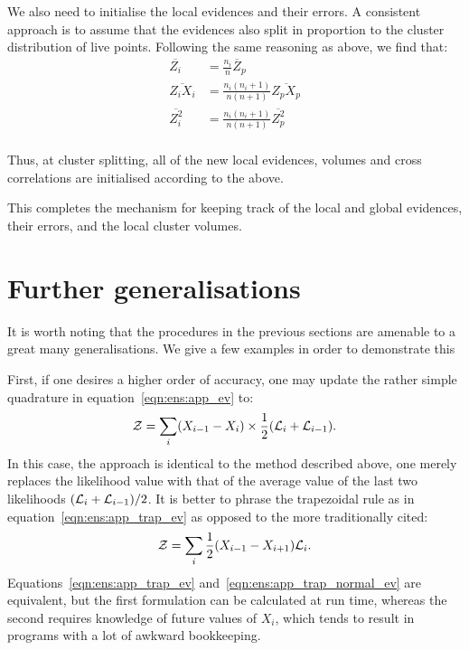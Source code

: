 We also need to initialise the local evidences and their errors. A consistent approach is to assume that the evidences also split in proportion to the cluster distribution of live points. Following the same reasoning as above, we find that:
\begin{align}
  \overline{Z_i}&=  \frac{n_i}{n} \overline Z_p \\
  \overline{Z_i X_i}&= \frac{n_i(n_i+1)}{n(n+1)} \overline{Z_p X_p} \\
  \overline{Z_i^2}  &= \frac{n_i(n_i+1)}{n(n+1)} \overline{Z_p^2} \\
\end{align}

Thus, at cluster splitting, all of the new local evidences, volumes and cross correlations are initialised according to the above.

This completes the mechanism for keeping track of the local and global evidences, their errors, and the local cluster volumes.


\section{Further generalisations}

It is worth noting that the procedures in the previous sections are amenable to a great many generalisations. We give a few examples in order to demonstrate this

First, if one desires a higher order of accuracy, one may update the rather simple quadrature in equation~\eqref{eqn:ens:app_ev} to:
\begin{equation}
  \mathcal{Z} = \sum\limits_{i} (X_{i-1}-X_{i}) \times \frac{1}{2}(\mathcal{L}_i+\mathcal{L}_{i-1}).
  \label{eqn:ens:app_trap_ev}
\end{equation}
In this case, the approach is identical to the method described above, one merely replaces the likelihood value with that of the average value of the last two likelihoods \((\mathcal{L}_i + \mathcal{L}_{i-1})/2\).
It is better to phrase the trapezoidal rule as in equation~\eqref{eqn:ens:app_trap_ev} as opposed to the more traditionally cited:
\begin{equation}
  \mathcal{Z} = \sum\limits_{i} \frac{1}{2}(X_{i-1}-X_{i+1}) \mathcal{L}_i.
  \label{eqn:ens:app_trap_normal_ev}
\end{equation}
Equations~\eqref{eqn:ens:app_trap_ev} and~\eqref{eqn:ens:app_trap_normal_ev} are equivalent, but the first formulation can be calculated at run time, whereas the second requires knowledge of future values of \(X_{i}\), which tends to result in programs with a lot of awkward bookkeeping.

